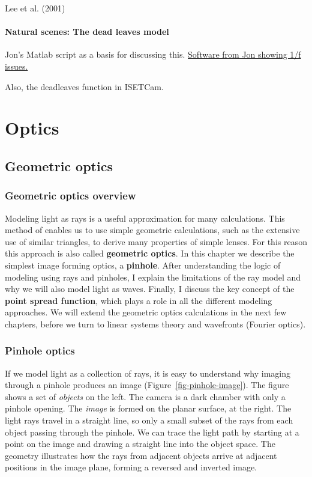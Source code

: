 \documentclass[
  letterpaper,
]{book}
\begin{document}
Lee et al. (2001)

\subsection{Natural scenes: The dead leaves
model}\label{natural-scenes-the-dead-leaves-model}

Jon's Matlab script as a basis for discussing this.
\href{https://github.com/isetbio/isetbio/blob/main/scripts/oneoverf/s_oneOverF1D.m}{Software
from Jon showing 1/f issues.}

Also, the deadleaves function in ISETCam.

\part{Optics}

\chapter{Geometric optics}\label{sec-geometric-optics}

\section{Geometric optics overview}\label{geometric-optics-overview}

Modeling light as rays is a useful approximation for many calculations.
This method of enables us to use simple geometric calculations, such as
the extensive use of similar triangles, to derive many properties of
simple lenses. For this reason this approach is also called
\textbf{geometric optics}. In this chapter we describe the simplest
image forming optics, a \textbf{pinhole}. After understanding the logic
of modeling using rays and pinholes, I explain the limitations of the
ray model and why we will also model light as waves. Finally, I discuss
the key concept of the \textbf{point spread function}, which plays a
role in all the different modeling approaches. We will extend the
geometric optics calculations in the next few chapters, before we turn
to linear systems theory and wavefronts (Fourier optics).

\section{Pinhole optics}\label{pinhole-optics}

If we model light as a collection of rays, it is easy to understand why
imaging through a pinhole produces an image
(Figure~\ref{fig-pinhole-image}). The figure shows a set of
\emph{objects} on the left. The camera is a dark chamber with only a
pinhole opening. The \emph{image} is formed on the planar surface, at
the right. The light rays travel in a straight line, so only a small
subset of the rays from each object passing through the pinhole. We can
trace the light path by starting at a point on the image and drawing a
straight line into the object space. The geometry illustrates how the
rays from adjacent objects arrive at adjacent positions in the image
plane, forming a reversed and inverted image.
\end{document}

